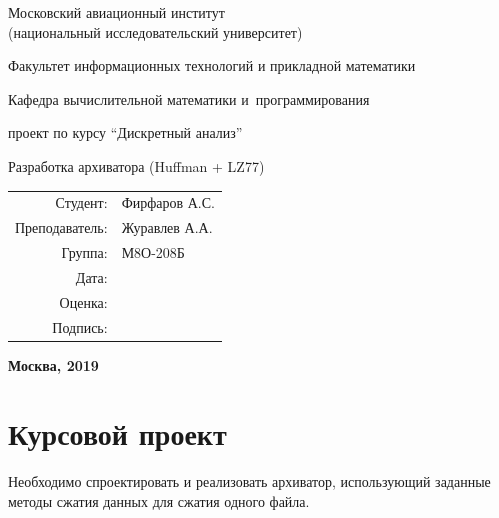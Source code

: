 \documentclass[14pt]{article}
\begin{document}
\begin{titlepage}
\begin{center}
\bfseries

{\Large Московский авиационный институт\\ (национальный исследовательский университет)}

\vspace{48pt}

{\large Факультет информационных технологий и прикладной математики}

\vspace{24pt}

{\large Кафедра вычислительной математики и~программирования}

\vspace{48pt}

{ проект по курсу \enquote{Дискретный анализ}}
\vspace{24pt}

{\large Разработка архиватора (Huffman + LZ77)}

\end{center}

\vspace{72pt}

\begin{flushright}
\begin{tabular}{rl}
Студент: & Фирфаров А.С. \\
Преподаватель: & Журавлев А.А. \\
Группа: & М8О-208Б \\
Дата: & \\
Оценка: & \\
Подпись: & \\
\end{tabular}
\end{flushright}

\vfill

\begin{center}
\bfseries
Москва, 2019
\end{center}
\end{titlepage}
\pagebreak

\section*{Курсовой проект}

Необходимо спроектировать и реализовать архиватор, использующий заданные  методы сжатия данных для сжатия одного файла. \\
\end{document}
